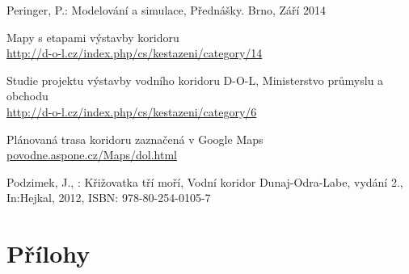 \documentclass[11pt,a4paper]{article}
\begin{document}
    \begin{enumerate}[label={[\arabic*]}]
      \item Peringer, P.: Modelování a simulace, Přednášky. Brno, Září 2014
        \label{peringer}
      \item Mapy s etapami výstavby koridoru \\
        \href{http://d-o-l.cz/index.php/cs/kestazeni/category/14}
        {http://d-o-l.cz/index.php/cs/kestazeni/category/14} \label{mapa}
      \item Studie projektu výstavby vodního koridoru D-O-L,
            Ministerstvo průmyslu a obchodu \\
        \href{http://d-o-l.cz/index.php/cs/kestazeni/category/6}
             {http://d-o-l.cz/index.php/cs/kestazeni/category/6} \label{studie}
      \item Plánovaná trasa koridoru zaznačená v Google Maps \\
        \href{http://povode.aspone.cz/Maps/dol.html}
             {povodne.aspone.cz/Maps/dol.html} \label{google-mapa}
      \item Podzimek, J., : Křižovatka tří moří, Vodní koridor Dunaj-Odra-Labe,
            vydání 2., In:Hejkal, 2012, ISBN: 978-80-254-0105-7 \label{kniha}
    \end{enumerate}

  \appendix
    \newpage

  \section{Přílohy}

  
\end{document}
